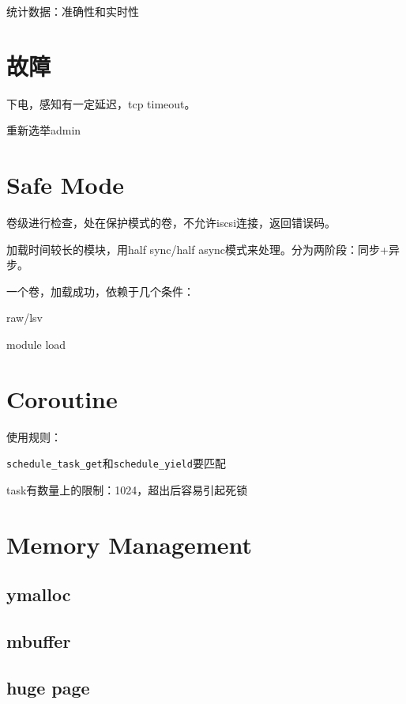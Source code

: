 统计数据：准确性和实时性

\section{故障}

下电，感知有一定延迟，tcp timeout。

重新选举admin

\section{Safe Mode}

卷级进行检查，处在保护模式的卷，不允许iscsi连接，返回错误码。

加载时间较长的模块，用half sync/half async模式来处理。分为两阶段：同步+异步。

一个卷，加载成功，依赖于几个条件：
\begin{compactitem}
    \item raw/lsv
    \item module load
\end{compactitem}

\section{Coroutine}

使用规则：
\begin{compactitem}
    \item \verb|schedule_task_get|和\verb|schedule_yield|要匹配
    \item task有数量上的限制：1024，超出后容易引起死锁
\end{compactitem}

\section{Memory Management}

\subsection{ymalloc}

\subsection{mbuffer}

\subsection{huge page}

